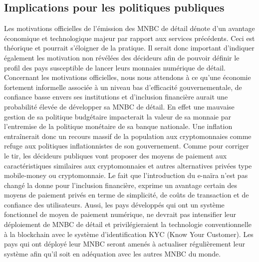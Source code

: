 \documentclass[12pt]{article}
\begin{document}
\subsection{Implications pour les politiques publiques}

Les motivations officielles de l'émission des MNBC de détail dénote d'un avantage économique et technologique majeur par rapport aux services précédents. Ceci est théorique et pourrait s'éloigner de la pratique. Il serait donc important d'indiquer également les motivation non révélées des décideurs afin de pouvoir définir le profil des pays susceptible de lancer leurs monnaies numérique de détail. \\

Concernant les motivations officielles, nous nous attendons à ce qu'une économie fortement informelle associée à un niveau bas d'efficacité gouvernementale, de confiance basse envers ses institutions et d'inclusion financière aurait une probabilité élevée de développer sa MNBC de détail. En effet une mauvaise gestion de sa politique budgétaire impacterait la valeur de sa monnaie par l'entremise de la politique monétaire de sa banque nationale. Une inflation entraînerait donc un recours massif de la population aux cryptomonnaies comme refuge aux politiques inflationnistes de son gouvernement. Comme pour corriger le tir, les décideurs publiques vont proposer des moyens de paiement aux caractéristiques similaires aux cryptomonnaies et autres alternatives privées type mobile-money ou cryptomonnaie. Le fait que l'introduction du e-naïra n'est pas changé la donne pour l'inclusion financière, exprime un avantage certain des moyens de paiement privés en terme de simplicité, de coûts de transaction et de confiance des utilisateurs. Aussi, les pays développés qui ont un système fonctionnel de moyen de paiement numérique, ne devrait pas intensifier leur déploiement de MNBC de détail et privilégieraient la technologie conventionnelle à la blockchain avec le système d'identification KYC (Know Your Customer). Les pays qui ont déployé leur MNBC seront amenés à actualiser régulièrement leur système afin qu'il soit en adéquation avec les autres MNBC du monde.\\
\end{document}
